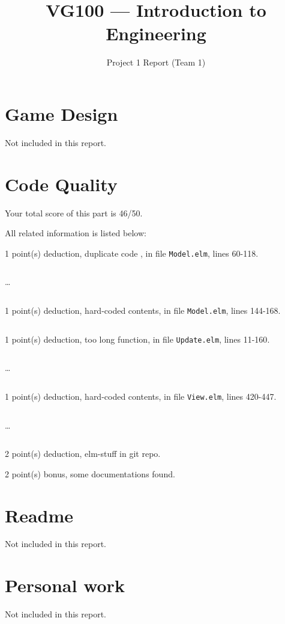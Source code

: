 \documentclass{article}
\title{VG100 --- Introduction to\\ Engineering}
\subtitle{Project 1 Report (Team 1)}
\begin{document}
\maketitle

\section{Game Design}

Not included in this report.

\section{Code Quality}

Your total score of this part is 46/50. \medskip

All related information is listed below: \medskip

1 point(s) {\color{red}deduction}, duplicate code , in file {\color{blue}\texttt{Model.elm}}, lines {\color{blue}60-118}.

\inputminted[firstline=60,lastline=69]{elm}{Model.elm}

\dots

\inputminted[firstline=109,lastline=118]{elm}{Model.elm}

1 point(s) {\color{red}deduction}, hard-coded contents, in file {\color{blue}\texttt{Model.elm}}, lines {\color{blue}144-168}.

\inputminted[firstline=144,lastline=168]{elm}{Model.elm}

1 point(s) {\color{red}deduction}, too long function, in file {\color{blue}\texttt{Update.elm}}, lines {\color{blue}11-160}.

\inputminted[firstline=11,lastline=20]{elm}{Update.elm}

\dots

\inputminted[firstline=151,lastline=160]{elm}{Update.elm}

1 point(s) {\color{red}deduction}, hard-coded contents, in file {\color{blue}\texttt{View.elm}}, lines {\color{blue}420-447}.

\inputminted[firstline=420,lastline=429]{elm}{View.elm}

\dots

\inputminted[firstline=438,lastline=447]{elm}{View.elm}

2 point(s) {\color{red}deduction}, elm-stuff in git repo.\medskip

2 point(s) {\color{red}bonus}, some documentations found.\medskip



\newpage

\section{Readme}

Not included in this report.

\section{Personal work}

Not included in this report.


\newpage
\end{document}
